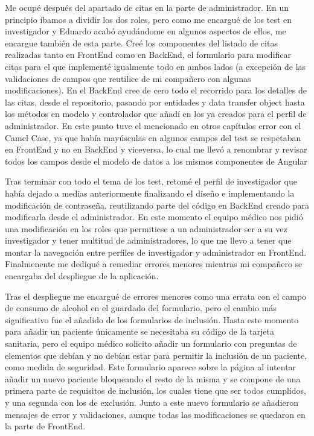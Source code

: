 Me ocupé después del apartado de citas en la parte de administrador. En un principio íbamos a dividir los dos roles, pero como me encargué de los test en investigador y Eduardo acabó ayudándome en algunos aspectos de ellos, me encargue también de esta parte. Creé los componentes del listado de citas realizadas tanto en FrontEnd como en BackEnd, el formulario para modificar citas para el que implementé igualmente todo en ambos lados (a excepción de las validaciones de campos que reutilice de mi compañero con algunas modificaciones). En el BackEnd cree de cero todo el recorrido para los detalles de las citas, desde el repositorio, pasando por entidades y data transfer object hasta los métodos en modelo y controlador que añadí en los ya creados para el perfil de administrador. En este punto tuve el mencionado en otros capítulos error con el Camel Case, ya que había mayúsculas en algunos campos del test se respetaban en FrontEnd y no en BackEnd y viceversa, lo cual me llevó a renombrar y revisar todos los campos desde el modelo de datos a los mismos componentes de Angular\newline

Tras terminar con todo el tema de los test, retomé el perfil de investigador que había dejado a medias anteriormente finalizando el diseño e implementando la modificación de contraseña, reutilizando parte del código en BackEnd creado para modificarla desde el administrador. En este momento el equipo médico nos pidió una modificación en los roles que permitiese a un administrador ser a su vez investigador y tener multitud de administradores, lo que me llevo a tener que montar la navegación entre perfiles de investigador y administrador en FrontEnd. Finalmenente me dediqué a remediar errores menores mientras mi compañero se encargaba del despliegue de la aplicación.\newline

Tras el despliegue me encargué de errores menores como una errata con el campo de consumo de alcohol en el guardado del formulario, pero el cambio más significativo fue el añadido de los formularios de inclusión. Hasta este momento para añadir un paciente únicamente se necesitaba su código de la tarjeta sanitaria, pero el equipo médico solicito añadir un formulario con preguntas de elementos que debían y no debían estar para permitir la inclusión de un paciente, como medida de seguridad. Este formulario aparece sobre la página al intentar añadir un nuevo paciente bloqueando el resto de la misma y se compone de una primera parte de requisitos de inclusión, los cuales tiene que ser todos cumplidos, y una segunda con los de exclusión. Junto a este nuevo formulario se añadieron mensajes de error y validaciones, aunque todas las modificaciones se quedaron en la parte de FrontEnd.\newline

